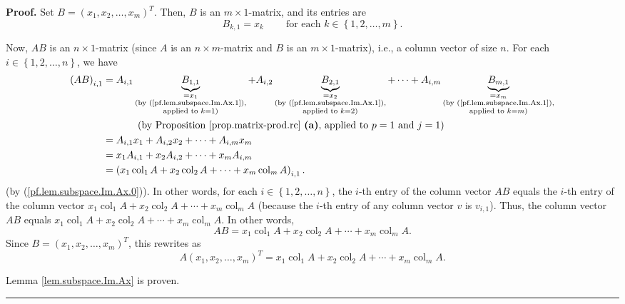\documentclass[numbers=enddot,12pt,final,onecolumn,notitlepage]{scrartcl}%
\theoremstyle{definition}
\newenvironment{proof}[1][Proof]{\noindent\textbf{#1.} }{\ \rule{0.5em}{0.5em}}
\begin{document}
\begin{proof}
Set $B=\left(  x_{1},x_{2},\ldots,x_{m}\right)  ^{T}$. Then, $B$ is an
$m\times1$-matrix, and its entries are%
\begin{equation}
B_{k,1}=x_{k}\ \ \ \ \ \ \ \ \ \ \text{for each }k\in\left\{  1,2,\ldots
,m\right\}  . \label{pf.lem.subspace.Im.Ax.1}%
\end{equation}


Now, $AB$ is an $n\times1$-matrix (since $A$ is an $n\times m$-matrix and $B$
is an $m\times1$-matrix), i.e., a column vector of size $n$. For each
$i\in\left\{  1,2,\ldots,n\right\}  $, we have%
\begin{align*}
\left(  AB\right)  _{i,1}  &  =A_{i,1}\underbrace{B_{1,1}}_{\substack{=x_{1}%
\\\text{(by (\ref{pf.lem.subspace.Im.Ax.1}),}\\\text{applied to }k=1\text{)}%
}}+A_{i,2}\underbrace{B_{2,1}}_{\substack{=x_{2}\\\text{(by
(\ref{pf.lem.subspace.Im.Ax.1}),}\\\text{applied to }k=2\text{)}}%
}+\cdots+A_{i,m}\underbrace{B_{m,1}}_{\substack{=x_{m}\\\text{(by
(\ref{pf.lem.subspace.Im.Ax.1}),}\\\text{applied to }k=m\text{)}}}\\
&  \ \ \ \ \ \ \ \ \ \ \left(  \text{by Proposition \ref{prop.matrix-prod.rc}
\textbf{(a)}, applied to }p=1\text{ and }j=1\right) \\
&  =A_{i,1}x_{1}+A_{i,2}x_{2}+\cdots+A_{i,m}x_{m}\\
&  =x_{1}A_{i,1}+x_{2}A_{i,2}+\cdots+x_{m}A_{i,m}\\
&  =\left(  x_{1}\operatorname*{col}\nolimits_{1}A+x_{2}\operatorname*{col}%
\nolimits_{2}A+\cdots+x_{m}\operatorname*{col}\nolimits_{m}A\right)  _{i,1}.
\end{align*}
(by (\ref{pf.lem.subspace.Im.Ax.0})). In other words, for each $i\in\left\{
1,2,\ldots,n\right\}  $, the $i$-th entry of the column vector $AB$ equals the
$i$-th entry of the column vector $x_{1}\operatorname*{col}\nolimits_{1}%
A+x_{2}\operatorname*{col}\nolimits_{2}A+\cdots+x_{m}\operatorname*{col}%
\nolimits_{m}A$ (because the $i$-th entry of any column vector $v$ is
$v_{i,1}$). Thus, the column vector $AB$ equals $x_{1}\operatorname*{col}%
\nolimits_{1}A+x_{2}\operatorname*{col}\nolimits_{2}A+\cdots+x_{m}%
\operatorname*{col}\nolimits_{m}A$. In other words,%
\[
AB=x_{1}\operatorname*{col}\nolimits_{1}A+x_{2}\operatorname*{col}%
\nolimits_{2}A+\cdots+x_{m}\operatorname*{col}\nolimits_{m}A.
\]
Since $B=\left(  x_{1},x_{2},\ldots,x_{m}\right)  ^{T}$, this rewrites as%
\[
A\left(  x_{1},x_{2},\ldots,x_{m}\right)  ^{T}=x_{1}\operatorname*{col}%
\nolimits_{1}A+x_{2}\operatorname*{col}\nolimits_{2}A+\cdots+x_{m}%
\operatorname*{col}\nolimits_{m}A.
\]


Lemma \ref{lem.subspace.Im.Ax} is proven.
\end{proof}
\end{document}
